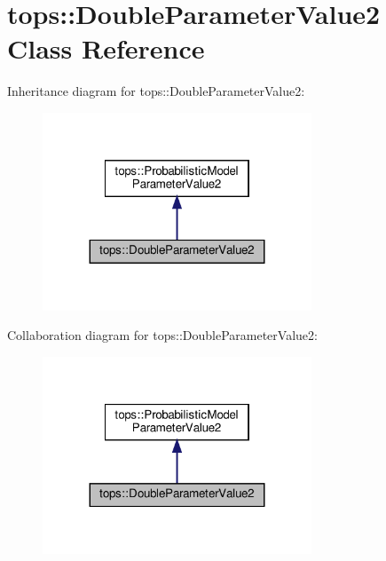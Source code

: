 \hypertarget{classtops_1_1DoubleParameterValue2}{}\section{tops\+:\+:Double\+Parameter\+Value2 Class Reference}
\label{classtops_1_1DoubleParameterValue2}


Inheritance diagram for tops\+:\+:Double\+Parameter\+Value2\+:
\nopagebreak
\begin{figure}[H]
\begin{center}
\leavevmode
\includegraphics[width=227pt]{classtops_1_1DoubleParameterValue2__inherit__graph}
\end{center}
\end{figure}


Collaboration diagram for tops\+:\+:Double\+Parameter\+Value2\+:
\nopagebreak
\begin{figure}[H]
\begin{center}
\leavevmode
\includegraphics[width=227pt]{classtops_1_1DoubleParameterValue2__coll__graph}
\end{center}
\end{figure}
